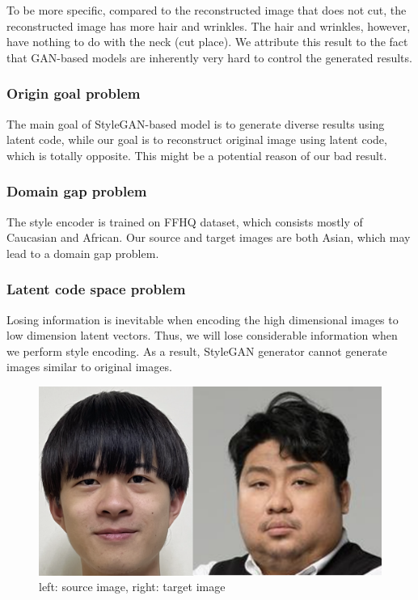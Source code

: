 To be more specific, compared to the reconstructed image that does not cut, the reconstructed image has more hair and wrinkles. The hair and wrinkles, however, have nothing to do with the neck (cut place). We attribute this result to the fact that GAN-based models are inherently very hard to control the generated results.

\subsubsection {Origin goal problem}
The main goal of StyleGAN-based model is to generate diverse results using latent code, while our goal is to reconstruct original image using latent code, which is totally opposite. This might be a potential reason of our bad result.

\subsubsection {Domain gap problem}
The style encoder is trained on FFHQ dataset, which consists mostly of Caucasian and African. Our source and target images are both Asian, which may lead to a domain gap problem.

\subsubsection {Latent code space problem}
Losing information is inevitable when encoding the high dimensional images to low dimension latent vectors. Thus, we will lose considerable information when we perform style encoding. As a result, StyleGAN generator cannot generate images similar to original images.


\begin{figure}[ht]
\centering
    \centering
    \includegraphics[scale=.25]{fig/source_target_pair.png}
    \caption{left: source image, right: target image}
    \label{fig:source target image}
\end{figure}

